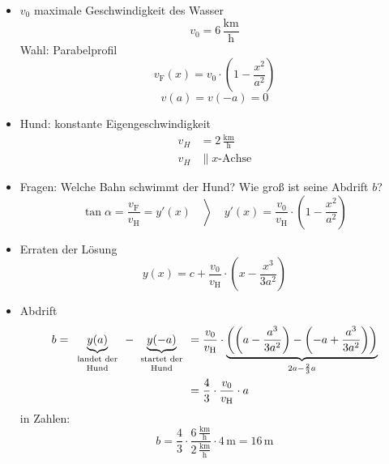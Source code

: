 \begin{example}\flush
  \begingroup
  \newcommand{\kmh}{\ensuremath{\,\textstyle \frac{\text{km}}{\text{h}}}}
  \begin{itemize}
    \item $v_0$ maximale Geschwindigkeit des Wasser
      \begin{equation*} v_0 = 6 \kmh \end{equation*}
      Wahl: Parabelprofil
      \begin{equation*} v_\text{F}(x) = v_0 \cdot \left( 1 - \frac{x^2}{a^2} \right) \end{equation*}
      \begin{equation*} v(a) = v(-a) = 0 \end{equation*}
    \item Hund: konstante Eigengeschwindigkeit
      \begin{align*}
        v_H &= 2 \kmh \\
        v_H &\parallel \text{$x$-Achse}
      \end{align*}
  \end{itemize}
  \par
  \begin{itemize} %
    \item Fragen: Welche Bahn schwimmt der Hund? Wie groß ist seine Abdrift $b$?
      \begin{equation*} \left. \tan \alpha = \frac{v_\text{F}}{v_\text{H}} = y'(x) \quad\right\rangle\quad y'(x) = \frac{v_0}{v_\text{H}} \cdot \left( 1 - \frac{x^2}{a^2}\right)\end{equation*}
    \item Erraten der Lösung
      \begin{equation*}
      y(x) = c + \frac{v_0}{v_\text{H}} \cdot \left( x - \frac{x^3}{3a^2}\right)
      \end{equation*}
    \item Abdrift
      \begin{align*}
        b = \underbrace{y(a)}_{\parbox{16mm}{\centering\scriptsize landet der Hund}} -\underbrace{y(-a)}_{\parbox{16mm}{\centering\scriptsize startet der Hund}} &= \ds\frac{v_0}{v_\text{H}} \cdot \underbrace{\left( \left( a - \frac{a^3}{3a^2}\right) - \left( -a + \frac{a^3}{3a^2}\right) \right)}_{2a - \frac 2 3 a} \\
        &= \ds\frac 4 3 \cdot \frac{v_0}{v_\text{H}}\cdot  a
      \end{align*}
      in Zahlen:
      \begin{equation*}
        b = \frac 4 3 \cdot \frac {6 \kmh}{2 \kmh} \cdot 4 \,\text{m} = 16 \,\text{m}
      \end{equation*}
  \end{itemize}
  \endgroup
\end{example}

